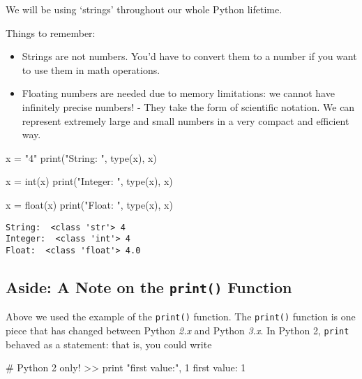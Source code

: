 \documentclass[
  letterpaper,
  DIV=11,
  numbers=noendperiod]{scrartcl}
\newenvironment{Shaded}{\begin{snugshade}}{\end{snugshade}}
\newcommand{\BuiltInTok}[1]{\textcolor[rgb]{0.00,0.23,0.31}{#1}}
\newcommand{\CommentTok}[1]{\textcolor[rgb]{0.37,0.37,0.37}{#1}}
\newcommand{\DecValTok}[1]{\textcolor[rgb]{0.68,0.00,0.00}{#1}}
\newcommand{\NormalTok}[1]{\textcolor[rgb]{0.00,0.23,0.31}{#1}}
\newcommand{\OperatorTok}[1]{\textcolor[rgb]{0.37,0.37,0.37}{#1}}
\newcommand{\StringTok}[1]{\textcolor[rgb]{0.13,0.47,0.30}{#1}}
\begin{document}
We will be using `strings' throughout our whole Python lifetime.

Things to remember:

\begin{itemize}
\item
  Strings are not numbers. You'd have to convert them to a number if you
  want to use them in math operations.
\item
  Floating numbers are needed due to memory limitations: we cannot have
  infinitely precise numbers! - They take the form of scientific
  notation. We can represent extremely large and small numbers in a very
  compact and efficient way.
\end{itemize}

\begin{Shaded}
\begin{Highlighting}[]
\NormalTok{x }\OperatorTok{=} \StringTok{"4"} 
\BuiltInTok{print}\NormalTok{(}\StringTok{"String: "}\NormalTok{, }\BuiltInTok{type}\NormalTok{(x),      x)}

\NormalTok{x }\OperatorTok{=} \BuiltInTok{int}\NormalTok{(x)}
\BuiltInTok{print}\NormalTok{(}\StringTok{"Integer: "}\NormalTok{, }\BuiltInTok{type}\NormalTok{(x),    x)}

\NormalTok{x }\OperatorTok{=} \BuiltInTok{float}\NormalTok{(x)}
\BuiltInTok{print}\NormalTok{(}\StringTok{"Float: "}\NormalTok{, }\BuiltInTok{type}\NormalTok{(x),    x)}
\end{Highlighting}
\end{Shaded}

\begin{verbatim}
String:  <class 'str'> 4
Integer:  <class 'int'> 4
Float:  <class 'float'> 4.0
\end{verbatim}

\hypertarget{aside-a-note-on-the-print-function}{%
\subsection{\texorpdfstring{Aside: A Note on the \texttt{print()}
Function}{Aside: A Note on the print() Function}}\label{aside-a-note-on-the-print-function}}

Above we used the example of the \texttt{print()} function. The
\texttt{print()} function is one piece that has changed between Python
\emph{2.x} and Python \emph{3.x}. In Python 2, \texttt{print} behaved as
a statement: that is, you could write

\begin{Shaded}
\begin{Highlighting}[]
\CommentTok{\# Python 2 only!}
\OperatorTok{\textgreater{}\textgreater{}} \BuiltInTok{print} \StringTok{"first value:"}\NormalTok{, }\DecValTok{1}
\NormalTok{first value: }\DecValTok{1}
\end{Highlighting}
\end{Shaded}
\end{document}
